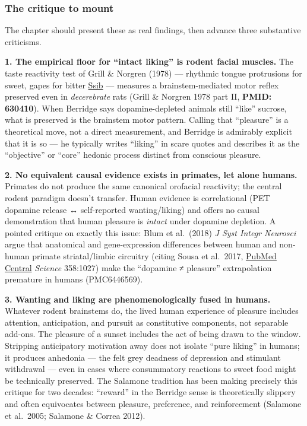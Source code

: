 \subsubsection{The critique to mount}\label{01_dopamine_substrate-the-critique-to-mount}

The chapter should present these as real findings, then advance three substantive criticisms.

\textbf{1. The empirical floor for ``intact liking'' is rodent facial muscles.} The taste reactivity test of Grill \& Norgren (1978) --- rhythmic tongue protrusions for sweet, gapes for bitter \href{http://www.ssib.org/web/classics/Grill&Norgren\%20I\%201978.pdf}{Ssib} --- measures a brainstem-mediated motor reflex preserved even in \emph{decerebrate} rats (Grill \& Norgren 1978 part II, \textbf{PMID: 630410}). When Berridge says dopamine-depleted animals still ``like'' sucrose, what is preserved is the brainstem motor pattern. Calling that ``pleasure'' is a theoretical move, not a direct measurement, and Berridge is admirably explicit that it is so --- he typically writes ``liking'' in scare quotes and describes it as the ``objective'' or ``core'' hedonic process distinct from conscious pleasure.

\textbf{2. No equivalent causal evidence exists in primates, let alone humans.} Primates do not produce the same canonical orofacial reactivity; the central rodent paradigm doesn't transfer. Human evidence is correlational (PET dopamine release ↔ self-reported wanting/liking) and offers no causal demonstration that human pleasure is \emph{intact} under dopamine depletion. A pointed critique on exactly this issue: Blum et al.~(2018) \emph{J Syst Integr Neurosci} argue that anatomical and gene-expression differences between human and non-human primate striatal/limbic circuitry (citing Sousa et al.~2017, \href{https://pmc.ncbi.nlm.nih.gov/articles/PMC6446569/}{PubMed Central} \emph{Science} 358:1027) make the ``dopamine ≠ pleasure'' extrapolation premature in humans (PMC6446569).

\textbf{3. Wanting and liking are phenomenologically fused in humans.} Whatever rodent brainstems do, the lived human experience of pleasure includes attention, anticipation, and pursuit as constitutive components, not separable add-ons. The pleasure of a sunset includes the act of being drawn to the window. Stripping anticipatory motivation away does not isolate ``pure liking'' in humans; it produces anhedonia --- the felt grey deadness of depression and stimulant withdrawal --- even in cases where consummatory reactions to sweet food might be technically preserved. The Salamone tradition has been making precisely this critique for two decades: ``reward'' in the Berridge sense is theoretically slippery and often equivocates between pleasure, preference, and reinforcement (Salamone et al.~2005; Salamone \& Correa 2012).

